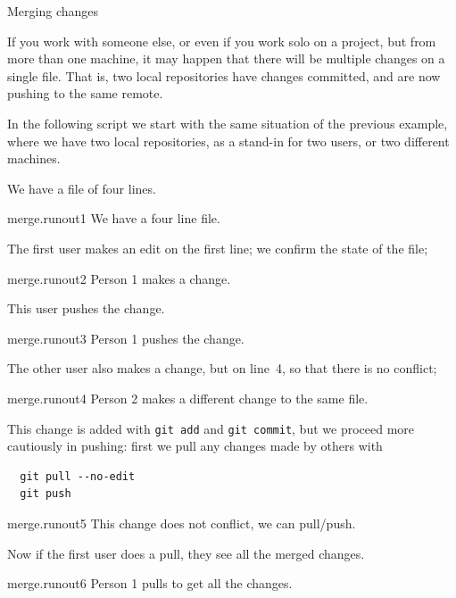 \newpage
{} {Merging changes}

If you work with someone else, or even if you work solo on a project,
but from more than one machine, it may happen that there will be multiple
changes on a single file. That is, two local repositories have changes committed,
and are now pushing to the same remote.

In the following script we start with the same situation of the previous example,
where we have two local repositories, as a stand-in for two users,
or two different machines.

We have a file of four lines.

\begin{gitstep}{merge.runout1}
  We have a four line file.
\end{gitstep}

The first user makes an edit on the first line; we confirm the state of the file;

\begin{gitstep}{merge.runout2}
  Person 1 makes a change.
\end{gitstep}

This user pushes the change.

\begin{gitstep}{merge.runout3}
  Person 1 pushes the change.
\end{gitstep}

The other user also makes a change, but on line~4, so that there is no conflict;

\begin{gitstep}{merge.runout4}
  Person 2 makes a different change to the same file.
\end{gitstep}

This change is added with \lstinline{git add} and \lstinline{git commit},
but we proceed more cautiously in pushing: first we pull any changes made by others with
\begin{lstlisting}
  git pull --no-edit
  git push
\end{lstlisting}

\begin{gitstep}{merge.runout5}
  This change does not conflict, we can pull/push.
\end{gitstep}

Now if the first user does a pull, they see all the merged changes.

\begin{gitstep}{merge.runout6}
  Person 1 pulls to get all the changes.
\end{gitstep}

